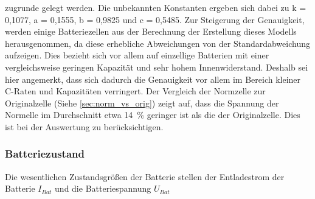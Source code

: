 zugrunde gelegt werden. 
Die unbekannten Konstanten ergeben sich dabei zu k = 0,1077, a = 0,1555, b = 0,9825 und c = 0,5485. Zur Steigerung der Genauigkeit, werden einige Batteriezellen aus der Berechnung der Erstellung dieses Modells herausgenommen, da diese erhebliche Abweichungen von der Standardabweichung aufzeigen. Dies bezieht sich vor allem auf einzellige Batterien mit einer vergleichsweise geringen Kapazität und sehr hohem Innenwiderstand. Deshalb sei hier angemerkt, dass sich dadurch die Genauigkeit vor allem im Bereich kleiner C-Raten und Kapazitäten verringert.
Der Vergleich der Normzelle zur Originalzelle (Siehe \ref{sec:norm_vs_orig}) zeigt auf, dass die Spannung der Normelle im Durchschnitt etwa \SI{14}{\%} geringer ist als die der Originalzelle. Dies ist bei der Auswertung zu berücksichtigen.


\subsubsection{Batteriezustand}
Die wesentlichen Zustandsgrößen der Batterie stellen der Entladestrom der Batterie \ensuremath{I_{Bat}} und die Batteriespannung \ensuremath{U_{Bat}}

